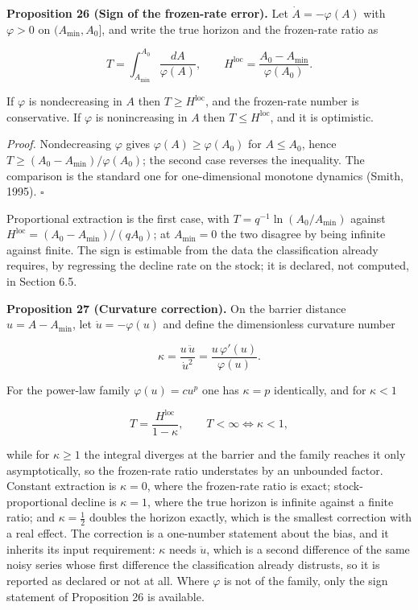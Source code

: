 \documentclass[11pt]{article}
\begin{document}
\textbf{Proposition 26 (Sign of the frozen-rate error).} Let \(\dot A=-\varphi(A)\) with \(\varphi>0\) on \((A_{\min},A_0]\), and write the true horizon and the frozen-rate ratio as 

$$T=\int_{A_{\min}}^{A_0}\frac{dA}{\varphi(A)}, \qquad H^{\mathrm{loc}}=\frac{A_0-A_{\min}}{\varphi(A_0)} .$$

 If \(\varphi\) is nondecreasing in \(A\) then \(T\ge H^{\mathrm{loc}}\), and the frozen-rate number is conservative. If \(\varphi\) is nonincreasing in \(A\) then \(T\le H^{\mathrm{loc}}\), and it is optimistic.

\emph{Proof.} Nondecreasing \(\varphi\) gives \(\varphi(A)\ge\varphi(A_0)\) for \(A\le A_0\), hence \(T\ge(A_0-A_{\min})/\varphi(A_0)\); the second case reverses the inequality. The comparison is the standard one for one-dimensional monotone dynamics (Smith, 1995). \(\square\)

Proportional extraction is the first case, with \(T=\allowbreak{}q^{-1}\ln(A_0/\allowbreak{}A_{\min})\) against \(H^{\mathrm{loc}}=\allowbreak{}(A_0-A_{\min})/(qA_0)\); at \(A_{\min}=0\) the two disagree by being infinite against finite. The sign is estimable from the data the classification already requires, by regressing the decline rate on the stock; it is declared, not computed, in Section 6.5.

\textbf{Proposition 27 (Curvature correction).} On the barrier distance \(u=A-A_{\min}\), let \(\dot u=-\varphi(u)\) and define the dimensionless curvature number 

$$\kappa=\frac{u\,\ddot u}{\dot u^{2}}=\frac{u\,\varphi'(u)}{\varphi(u)} .$$

 For the power-law family \(\varphi(u)=cu^{p}\) one has \(\kappa=p\) identically, and for \(\kappa<1\) 

$$T=\frac{H^{\mathrm{loc}}}{1-\kappa}, \qquad T<\infty\iff\kappa<1,$$

 while for \(\kappa\ge1\) the integral diverges at the barrier and the family reaches it only asymptotically, so the frozen-rate ratio understates by an unbounded factor. Constant extraction is \(\kappa=0\), where the frozen-rate ratio is exact; stock-proportional decline is \(\kappa=1\), where the true horizon is infinite against a finite ratio; and \(\kappa=\tfrac12\) doubles the horizon exactly, which is the smallest correction with a real effect. The correction is a one-number statement about the bias, and it inherits its input requirement: \(\kappa\) needs \(\ddot u\), which is a second difference of the same noisy series whose first difference the classification already distrusts, so it is reported as declared or not at all. Where \(\varphi\) is not of the family, only the sign statement of Proposition 26 is available.
\end{document}

